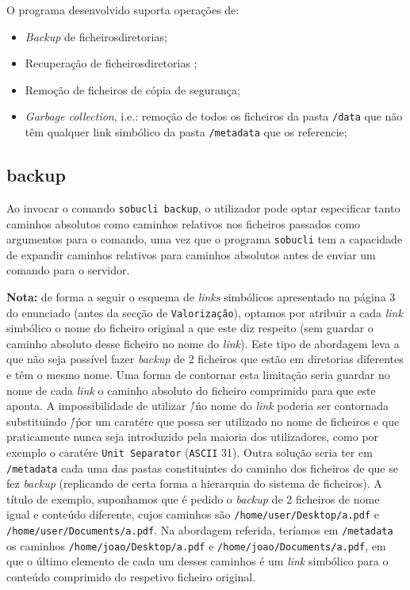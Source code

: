 \documentclass[a4paper,12pt,titlepage,draft,portuguese]{article}
\begin{document}
O programa desenvolvido suporta operações de:

	\begin{itemize}
		\item \emph{Backup} de ficheiros\/diretorias;
		\item Recuperação de ficheiros\/diretorias ;
		\item Remoção de ficheiros de cópia de segurança;
		\item \emph{Garbage collection}, i.e.: remoção de todos os ficheiros da pasta \texttt{/data} que não têm qualquer link simbólico da pasta \texttt{/metadata} que os referencie;
	\end{itemize}

\subsection{backup}

Ao invocar o comando \texttt{sobucli backup}, o utilizador pode optar especificar tanto caminhos absolutos como caminhos relativos nos ficheiros passados como argumentos para o comando, uma vez que o programa \texttt{sobucli} tem a capacidade de expandir caminhos relativos para caminhos absolutos antes de enviar um comando para o servidor.

\textbf{Nota:} de forma a seguir o esquema de \emph{links} simbólicos apresentado na página 3 do enunciado (antes da secção de \texttt{Valorização}), optamos por atribuir a cada \emph{link} simbólico o nome do ficheiro original a que este diz respeito (sem guardar o caminho absoluto desse ficheiro no nome do \emph{link}). Este tipo de abordagem leva a que não seja possível fazer \emph{backup} de 2 ficheiros que estão em diretorias diferentes e têm o mesmo nome. Uma forma de contornar esta limitação seria guardar no nome de cada \emph{link} o caminho absoluto do ficheiro comprimido para que este aponta. A impossibilidade de utilizar \'/\' no nome do \emph{link} poderia ser contornada substituindo \'/\' por um caratére que possa ser utilizado no nome de ficheiros e que praticamente nunca seja introduzido pela maioria dos utilizadores, como por exemplo o caratére \texttt{Unit Separator} (\texttt{ASCII} 31). Outra solução seria ter em \texttt{/metadata} cada uma das pastas constituintes do caminho dos ficheiros de que se fez \emph{backup} (replicando de certa forma a hierarquia do sistema de ficheiros). A título de exemplo, suponhamos que é pedido o \emph{backup} de 2 ficheiros de nome igual e conteúdo diferente, cujos caminhos são \texttt{/home/user/Desktop/a.pdf} e \texttt{/home/user/Documents/a.pdf}. Na abordagem referida, teríamos em \texttt{/metadata} os caminhos \texttt{/home/joao/Desktop/a.pdf} e \texttt{/home/joao/Documents/a.pdf}, em que o último elemento de cada um desses caminhos é um \emph{link} simbólico para o conteúdo comprimido do respetivo ficheiro original.
\end{document}
